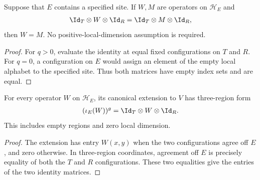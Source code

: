 \begin{lemma}
    \label{thm:three_region_middle_lift_equality}
    \leanok
    Suppose that $E$ contains a specified site. If $W,M$ are operators on
    $\mathcal H_E$ and
    \begin{align}
        \Id_T\otimes W\otimes \Id_R=\Id_T\otimes M\otimes \Id_R,
        \label{eq:three_region_middle_lift_equality}
    \end{align}
    then $W=M$. No positive-local-dimension assumption is required.
\end{lemma}
\begin{proof}\leanok
    For $q>0$, evaluate the identity at equal fixed configurations on $T$ and
    $R$. For $q=0$, a configuration on $E$ would assign an element of the empty
    local alphabet to the specified site. Thus both matrices have empty index
    sets and are equal.
\end{proof}

\begin{lemma}
    \label{thm:three_region_middle_embedding}
    \leanok
    For every operator $W$ on $\mathcal H_E$, its canonical extension to $V$
    has three-region form
    \begin{align}
        (\iota_E(W))^g=\Id_T\otimes W\otimes \Id_R.
        \label{eq:three_region_middle_embedding}
    \end{align}
    This includes empty regions and zero local dimension.
\end{lemma}
\begin{proof}\leanok
    The extension has entry $W(x,y)$ when the two configurations agree off
    $E$, and zero otherwise. In three-region coordinates, agreement off $E$
    is precisely equality of both the $T$ and $R$ configurations. These two
    equalities give the entries of the two identity matrices.
\end{proof}

